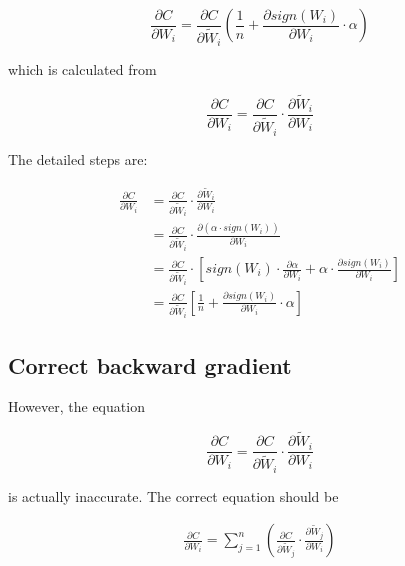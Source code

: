 \documentclass[12pt]{article} %
\begin{document}
\begin{equation}
	\frac{\partial C}{\partial W_{i}} = 
	\frac{\partial C}{\partial \widetilde{W}_{i}}
	(\frac{1}{n}+\frac{\partial sign(W_{i})}{\partial W_{i}} \cdot \alpha)
\end{equation}

which is calculated from

\begin{equation}
	\frac{\partial C}{\partial W_{i}} = 
	\frac{\partial C}{\partial \widetilde{W}_{i}} \cdot
	\frac{\partial \widetilde{W}_{i}}{\partial W_{i}}
\end{equation}

The detailed steps are:

\begin{equation}
\begin{aligned}
	\frac{\partial C}{\partial W_{i}}
	&= 
		\frac{\partial C}{\partial \widetilde{W}_{i}} \cdot
		\frac{\partial \widetilde{W}_{i}}{\partial W_{i}}\\
	&=
		\frac{\partial C}{\partial \widetilde{W}_{i}} \cdot
		\frac{\partial (\alpha \cdot sign(W_{i}))}{\partial W_{i}}\\
	&=
		\frac{\partial C}{\partial \widetilde{W}_{i}} \cdot
		[sign(W_{i})\cdot\frac{\partial \alpha}{\partial W_{i}} + 
		\alpha \cdot \frac{\partial sign(W_{i})}{\partial W_{i}}]\\
	&=
		\frac{\partial C}{\partial \widetilde{W}_{i}}
		[\frac{1}{n}+\frac{\partial sign(W_{i})}{\partial W_{i}} \cdot \alpha]
\end{aligned}
\end{equation}

\subsection{Correct backward gradient}
However, the equation

\begin{equation}
	\frac{\partial C}{\partial W_{i}} = 
	\frac{\partial C}{\partial \widetilde{W}_{i}} \cdot
	\frac{\partial \widetilde{W}_{i}}{\partial W_{i}}
\end{equation}

is actually inaccurate. The correct equation should be

\begin{equation}
\begin{aligned}
	\frac{\partial C}{\partial W_{i}} = 
	\sum_{j=1}^{n} (\frac{\partial C}{\partial \widetilde{W}_j}\cdot
	\frac{\partial \widetilde{W}_j}{\partial W_i})
\end{aligned}
\end{equation}
\end{document}
